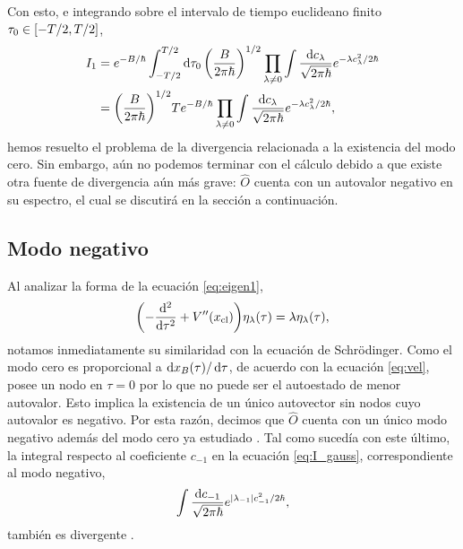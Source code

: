 Con esto, e integrando sobre el intervalo de tiempo euclideano finito $\tau_0 \in \qty[-T/2, T/2]$, %
\begin{align}
	I_1 &= e^{-B/\hbar} \int_{-T/2}^{T/2} \dd{\tau_0}\qty(\frac{B}{2\pi \hbar})^{1/2} \prod_{\lambda \neq 0} \int  \frac{\dd{c_\lambda}}{\sqrt{2\pi \hbar}} e^{-\lambda c_\lambda^2/2\hbar}  \\
	&=\qty(\frac{B}{2\pi \hbar})^{1/2}  Te^{-B/\hbar}  \prod_{\lambda \neq 0} \int \frac{\dd{c_\lambda}}{\sqrt{2\pi \hbar}} e^{-\lambda c_\lambda^2/2\hbar},
\end{align}
hemos resuelto el problema de la divergencia relacionada a la existencia del modo cero. Sin embargo, aún no podemos terminar con el cálculo debido a que existe otra fuente de divergencia aún más grave: $\hat{O}$ cuenta con un autovalor negativo en su espectro, el cual se discutirá en la sección a continuación.  

\subsection{Modo negativo} 

Al analizar la forma de la ecuación \eqref{eq:eigen1},
\begin{equation} 
\qty( - \dv[2]{\tau} + V''\qty(x_{\text{cl}})) \eta_\lambda\qty(\tau) = \lambda \eta_\lambda\qty(\tau),
\end{equation}
notamos inmediatamente su similaridad con la ecuación de Schr\"{o}dinger. Como el modo cero es proporcional a $\dd{x_B\qty(\tau)/\dd{\tau}}$, de acuerdo con la ecuación \eqref{eq:vel}, posee un nodo en $\tau = 0$ por lo que no puede ser el autoestado de menor autovalor. Esto implica la existencia de un único autovector sin nodos cuyo autovalor es negativo. Por esta razón, decimos que $\hat{O}$ cuenta con un único modo negativo  además del modo cero ya estudiado \cite{callan1977fate}. Tal como sucedía con este último,
la integral respecto al coeficiente $c_{-1}$ en la ecuación \eqref{eq:I_gauss}, correspondiente al modo negativo,
\begin{equation} \label{eq:integral_negativo}
\int \frac{\dd{c_{-1}}}{\sqrt{2\pi \hbar}}e^{\qty|\lambda_{-1}|c_{-1}^2/2\hbar},
\end{equation}
también es divergente%
. 

